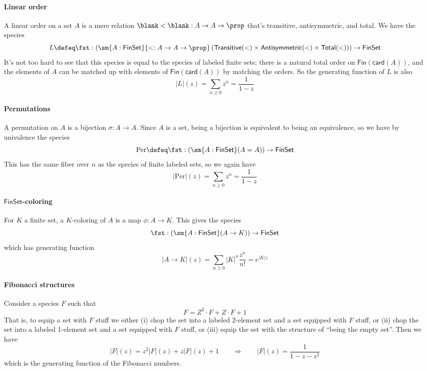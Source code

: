 \documentclass[fleqn]{article}
\newcommand{\card}{\mathsf{card}}
\newcommand{\gf}[1]{\abs{#1}\!(z)}
\newcommand{\fin}{\mathsf{Fin}}
\newcommand{\finset}{\mathsf{FinSet}}
\newcommand{\abs}[1]{\left\lvert #1 \right\rvert}
\theoremstyle{theorem}
\theoremstyle{definition}
\begin{document}
\paragraph{Linear order}
A linear order on a set $A$ is a mere relation $\blank < \blank : A \to A \to
\prop$ that's transitive, antisymmetric, and total.  We have the species
\[
  L \defeq \fst : \left(
    \sm{A:\finset}{< : A \to A \to \prop}\left(
      \mathsf{Transitive}(<)
      \times \mathsf{Antisymmetric}(<)
      \times \mathsf{Total}(<)
    \right)
  \right)
  \to
  \finset
\]
It's not too hard to see that this species is equal to the species of labeled
finite sets; there is a natural total order on $\fin(\card(A))$, and the
elements of $A$ can be matched up with elements of $\fin(\card(A))$ by matching
the orders.  So the generating function of $L$ is also
\[
  \gf{L} = \sum_{n\geq0}z^{n} = \frac{1}{1-z}
\]

\paragraph{Permutations}
A permutation on $A$ is a bijection $\sigma : A \to A$.  Since $A$ is a set,
being a bijection is equivalent to being an equivalence, so we have by
univalence the species
\[
  \mathrm{Per} \defeq \fst : \left(
    \sm{A : \finset}(A = A)
  \right) \to \finset
\]
This has the same fiber over $n$ as the species of finite labeled sets, so we
again have
\[
  \gf{\mathrm{Per}} = \sum_{n\geq0}z^{n} = \frac{1}{1-z}
\]

\paragraph{$\finset$-coloring}
For $K$ a finite set, a $K$-coloring of $A$ is a map $\phi : A \to K$.  This gives the
species
\[
  \fst : \left(
    \sm{A : \finset}(A \to K)
  \right) \to \finset
\]
which has generating function
\[
  \gf{A \to K} = \sum_{n\geq0} \abs{K}^{n}\frac{z^{n}}{n!}
  = e^{\abs{K}z}
\]

\paragraph{Fibonacci structures}
Consider a species $F$ such that
\[
  F = Z^{2} \cdot F + Z \cdot F + 1
\]
That is, to equip a set with $F$ stuff we either (i) chop the set into a
labeled 2-element set and a set equipped with $F$ stuff, or (ii) chop the set
into a labeled 1-element set and a set equipped with $F$ stuff, or (iii) equip
the set with the structure of ``being the empty set''.  Then we have
\[
  \gf{F} = z^{2}\gf{F} + z\gf{F} + 1
  \qquad\Longrightarrow\qquad
  \gf{F} = \frac{1}{1 - z - z^{2}}
\]
which is the generating function of the Fibonacci numbers.
\end{document}
